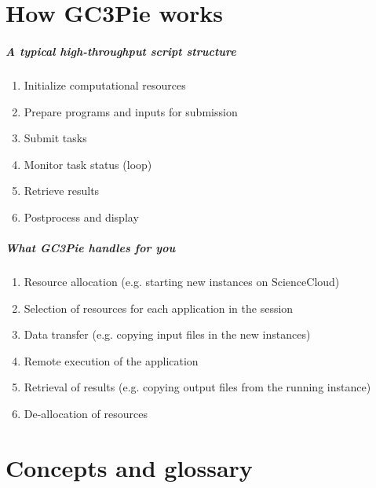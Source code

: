\documentclass[english,serif,mathserif,xcolor=pdftex,dvipsnames,table]{beamer}
\begin{document}
\part{How GC3Pie works}

\begin{frame}
  \frametitle{A typical high-throughput script structure}

  \begin{enumerate}
  \item Initialize computational resources
  \item Prepare programs and inputs for submission
  \item Submit tasks
  \item Monitor task status (loop)
  \item Retrieve results
  \item Postprocess and display
  \end{enumerate}
\end{frame}






\begin{frame}
  \frametitle{What GC3Pie handles for you}

  \begin{enumerate}\small
  \item Resource allocation (e.g. starting new instances on
    ScienceCloud)
  \item Selection of resources for each application in the session
  \item Data transfer (e.g. copying input files in the new instances)
  \item Remote execution of the application
  \item Retrieval of results (e.g. copying output files from the
    running instance)
  \item De-allocation of resources
  \end{enumerate}

\end{frame}


\part{Concepts and glossary}
\end{document}
